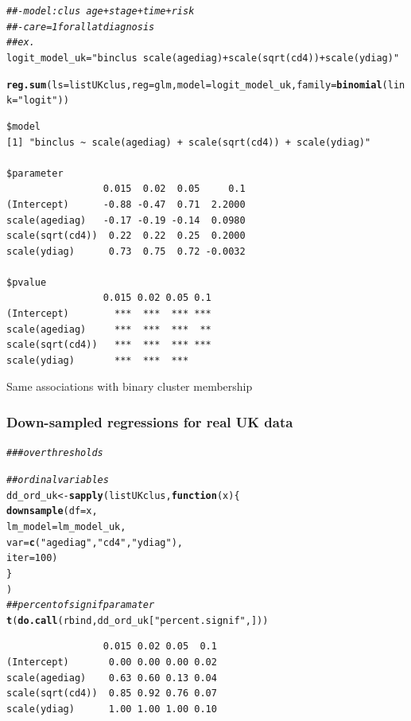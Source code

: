 \documentclass[]{revtex4}\usepackage[]{graphicx}\usepackage[]{color}
\makeatletter
\newcommand{\hlnum}[1]{\textcolor[rgb]{0.686,0.059,0.569}{#1}}%
\newcommand{\hlstr}[1]{\textcolor[rgb]{0.192,0.494,0.8}{#1}}%
\newcommand{\hlcom}[1]{\textcolor[rgb]{0.678,0.584,0.686}{\textit{#1}}}%
\newcommand{\hlstd}[1]{\textcolor[rgb]{0.345,0.345,0.345}{#1}}%
\newcommand{\hlkwa}[1]{\textcolor[rgb]{0.161,0.373,0.58}{\textbf{#1}}}%
\newcommand{\hlkwb}[1]{\textcolor[rgb]{0.69,0.353,0.396}{#1}}%
\newcommand{\hlkwc}[1]{\textcolor[rgb]{0.333,0.667,0.333}{#1}}%
\newcommand{\hlkwd}[1]{\textcolor[rgb]{0.737,0.353,0.396}{\textbf{#1}}}%
\newenvironment{kframe}{%
 \def\at@end@of@kframe{}%
 \ifinner\ifhmode%
  \def\at@end@of@kframe{\end{minipage}}%
  \begin{minipage}{\columnwidth}%
 \fi\fi%
 \def\FrameCommand##1{\hskip\@totalleftmargin \hskip-\fboxsep
 \colorbox{shadecolor}{##1}\hskip-\fboxsep
     \hskip-\linewidth \hskip-\@totalleftmargin \hskip\columnwidth}%
 \MakeFramed {\advance\hsize-\width
   \@totalleftmargin\z@ \linewidth\hsize
   \@setminipage}}%
 {\par\unskip\endMakeFramed%
 \at@end@of@kframe}
\newenvironment{knitrout}{}{} %
\makeatother
\begin{document}
\begin{knitrout}
\color{fgcolor}\begin{kframe}
\begin{alltt}
\hlcom{##- model: clus ~ age +  stage + time + risk}
\hlcom{##- care = 1 for all at diagnosis}
\hlcom{## ex. }
\hlstd{logit_model_uk} \hlkwb{=} \hlstr{"binclus ~ scale(agediag) + scale(sqrt(cd4)) + scale(ydiag)"}

\hlkwd{reg.sum}\hlstd{(}\hlkwc{ls} \hlstd{= listUKclus,} \hlkwc{reg} \hlstd{= glm,} \hlkwc{model} \hlstd{= logit_model_uk,} \hlkwc{family} \hlstd{=} \hlkwd{binomial}\hlstd{(}\hlkwc{link} \hlstd{=} \hlstr{"logit"}\hlstd{))}
\end{alltt}
\begin{verbatim}
$model
[1] "binclus ~ scale(agediag) + scale(sqrt(cd4)) + scale(ydiag)"

$parameter
                 0.015  0.02  0.05     0.1
(Intercept)      -0.88 -0.47  0.71  2.2000
scale(agediag)   -0.17 -0.19 -0.14  0.0980
scale(sqrt(cd4))  0.22  0.22  0.25  0.2000
scale(ydiag)      0.73  0.75  0.72 -0.0032

$pvalue
                 0.015 0.02 0.05 0.1
(Intercept)        ***  ***  *** ***
scale(agediag)     ***  ***  ***  **
scale(sqrt(cd4))   ***  ***  *** ***
scale(ydiag)       ***  ***  ***    
\end{verbatim}
\end{kframe}
\end{knitrout}
Same associations with binary cluster membership

\subsubsection{Down-sampled regressions for real UK data}
\begin{knitrout}
\color{fgcolor}\begin{kframe}
\begin{alltt}
\hlcom{### over thresholds}

\hlcom{## ordinal variables}
\hlstd{dd_ord_uk} \hlkwb{<-} \hlkwd{sapply}\hlstd{( listUKclus,} \hlkwa{function}\hlstd{(}\hlkwc{x}\hlstd{) \{}
  \hlkwd{downsample}\hlstd{(}\hlkwc{df} \hlstd{= x,}
             \hlkwc{lm_model} \hlstd{= lm_model_uk,}
             \hlkwc{var} \hlstd{=} \hlkwd{c}\hlstd{(}\hlstr{"agediag"}\hlstd{,} \hlstr{"cd4"}\hlstd{,} \hlstr{"ydiag"}\hlstd{),}
             \hlkwc{iter} \hlstd{=} \hlnum{100}\hlstd{)}
\hlstd{\}}
\hlstd{)}
\hlcom{## percent of signif paramater}
\hlkwd{t}\hlstd{(}\hlkwd{do.call}\hlstd{(rbind, dd_ord_uk[}\hlstr{"percent.signif"}\hlstd{, ] ))}
\end{alltt}
\begin{verbatim}
                 0.015 0.02 0.05  0.1
(Intercept)       0.00 0.00 0.00 0.02
scale(agediag)    0.63 0.60 0.13 0.04
scale(sqrt(cd4))  0.85 0.92 0.76 0.07
scale(ydiag)      1.00 1.00 1.00 0.10
\end{verbatim}
\end{kframe}
\end{knitrout}
\end{document}
